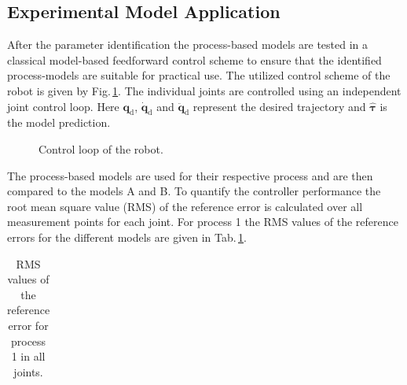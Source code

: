 
\subsection{Experimental Model Application}


After the parameter identification the process-based models are tested in a classical model-based feedforward control scheme to ensure that the identified process-models are suitable for practical use. The utilized control scheme of the robot is given by Fig.\,\ref{fig:controler}. The individual joints are controlled using an independent joint control loop. 
Here $\boldsymbol{q}_\text{d}$, $\dot{\boldsymbol{q}}_\text{d}$ and $\ddot{\boldsymbol{q}}_\text{d}$ represent the desired trajectory and $\hat{\boldsymbol{\tau}}$ is the model prediction.


\begin{figure}[tb]
  \vspace{-0.2cm}
  \centering
   
   \vspace{-0.2 cm}
  \caption{Control loop of the robot.}
  \label{fig:controler}
  \vspace{-0.1cm}
\end{figure}


The process-based models are used for their respective process and are then compared to the models A and B. %
To quantify the controller performance the root mean square value (RMS) of the reference error is calculated over all measurement points for each joint. For process 1 the RMS values of the reference errors for the different models are given in Tab.\,\ref{tab:RefErrorProcess1}.%

\begin{table}[tb]
	\caption{RMS values of the reference error for process 1 in all joints.}\label{tab:RefErrorProcess1}
	\centering
	\begin{tabular}[h]{|r|c|c|c|c|}\hline
		
	\end{tabular}
\end{table}

